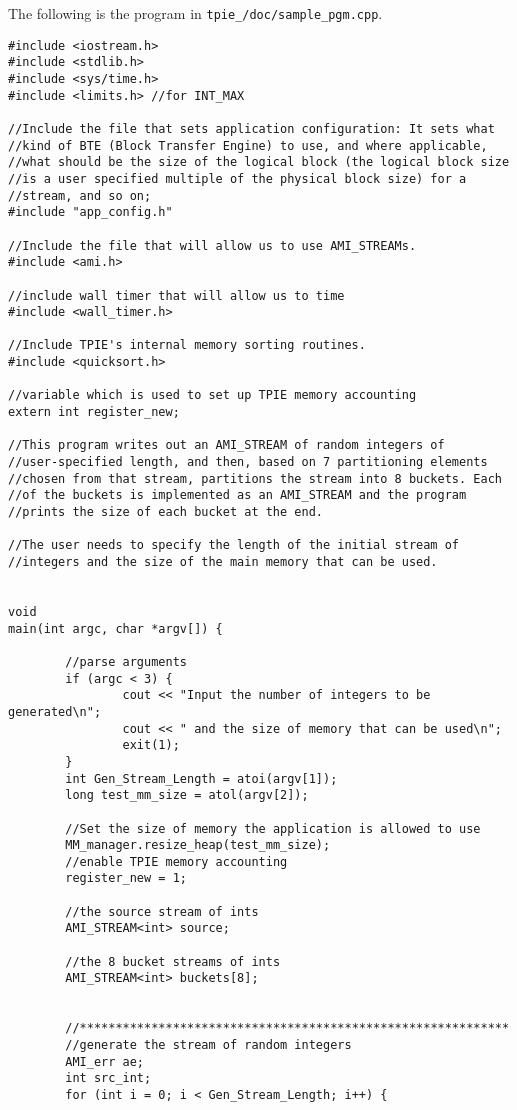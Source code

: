 The following is the program in {\tt  tpie\_\version/doc/sample\_pgm.cpp}.
\begin{verbatim}
#include <iostream.h>
#include <stdlib.h>
#include <sys/time.h>
#include <limits.h> //for INT_MAX

//Include the file that sets application configuration: It sets what
//kind of BTE (Block Transfer Engine) to use, and where applicable,
//what should be the size of the logical block (the logical block size
//is a user specified multiple of the physical block size) for a
//stream, and so on;
#include "app_config.h"

//Include the file that will allow us to use AMI_STREAMs.
#include <ami.h>

//include wall timer that will allow us to time
#include <wall_timer.h>

//Include TPIE's internal memory sorting routines.
#include <quicksort.h>

//variable which is used to set up TPIE memory accounting
extern int register_new;

//This program writes out an AMI_STREAM of random integers of
//user-specified length, and then, based on 7 partitioning elements
//chosen from that stream, partitions the stream into 8 buckets. Each
//of the buckets is implemented as an AMI_STREAM and the program
//prints the size of each bucket at the end.

//The user needs to specify the length of the initial stream of
//integers and the size of the main memory that can be used.


void
main(int argc, char *argv[]) {
        
        //parse arguments
        if (argc < 3) {
                cout << "Input the number of integers to be generated\n";
                cout << " and the size of memory that can be used\n";
                exit(1);
        }
        int Gen_Stream_Length = atoi(argv[1]);
        long test_mm_size = atol(argv[2]);
        
        //Set the size of memory the application is allowed to use
        MM_manager.resize_heap(test_mm_size);
        //enable TPIE memory accounting
        register_new = 1;
        
        //the source stream of ints
        AMI_STREAM<int> source;

        //the 8 bucket streams of ints
        AMI_STREAM<int> buckets[8];
        
        
        //************************************************************
        //generate the stream of random integers
        AMI_err ae;
        int src_int;
        for (int i = 0; i < Gen_Stream_Length; i++) {
                

\end{verbatim}

